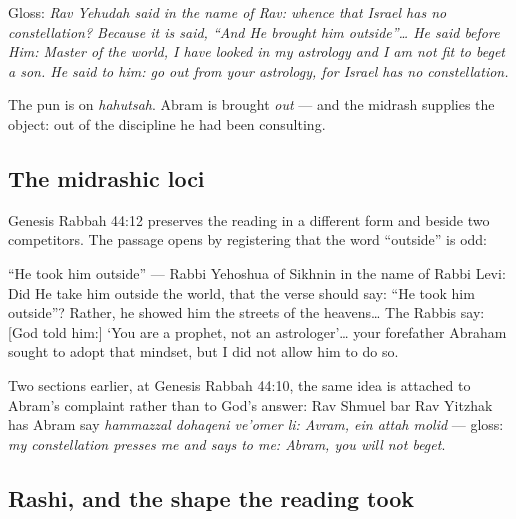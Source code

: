 \noindent Gloss: \emph{Rav Yehudah said in the name of Rav: whence that Israel
has no constellation? Because it is said, ``And He brought him outside''\dots{}
He said before Him: Master of the world, I have looked in my astrology and I am
not fit to beget a son. He said to him: go out from your astrology, for Israel
has no constellation.}

The pun is on \textit{hahutsah}. Abram is brought \textit{out} --- and the
midrash supplies the object: out of the discipline he had been consulting.

\subsection{The midrashic loci}

Genesis Rabbah 44:12 preserves the reading in a different form and beside two
competitors. The passage opens by registering that the word ``outside'' is odd:

\begin{studyframe}
``He took him outside'' --- Rabbi Yehoshua of Sikhnin in the name of Rabbi Levi:
Did He take him outside the world, that the verse should say: ``He took him
outside''? Rather, he showed him the streets of the heavens\dots{} The Rabbis
say: [God told him:] `You are a prophet, not an astrologer'\dots{} your
forefather Abraham sought to adopt that mindset, but I did not allow him to do
so.
\end{studyframe}

Two sections earlier, at Genesis Rabbah 44:10, the same idea is attached to Abram's
complaint rather than to God's answer: Rav Shmuel bar Rav Yitzhak has Abram say
\textit{hammazzal dohaqeni ve'omer li: Avram, ein attah molid} --- gloss:
\emph{my constellation presses me and says to me: Abram, you will not beget}.

\subsection{Rashi, and the shape the reading took}

